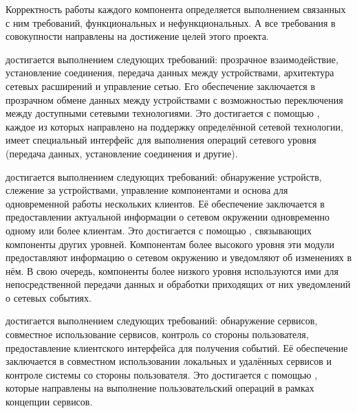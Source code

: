 

%
Корректность работы каждого компонента  определяется выполнением связанных с ним требований, функциональных и нефункциональных.
%
А все требования в совокупности направлены на достижение целей этого проекта. 

%
 достигается выполнением следующих требований: прозрачное взаимодействие, установление соединения, передача данных между устройствами, архитектура сетевых расширений и управление сетью. 
%
Его обеспечение заключается в прозрачном обмене данных между устройствами с возможностью переключения между доступными сетевыми технологиями.
%
Это достигается с помощью , каждое из которых направлено на поддержку определённой сетевой технологии, имеет специальный интерфейс для выполнения операций сетевого уровня (передача данных, установление соединения и другие). 

%
 достигается выполнением следующих требований: обнаружение устройств, слежение за устройствами, управление компонентами и основа для одновременной работы нескольких клиентов.
%
Её обеспечение заключается в предоставлении актуальной информации о сетевом окружении одновременно одному или более клиентам. 
%
Это достигается с помощью , связывающих компоненты других уровней. 
%
Компонентам более высокого уровня эти модули предоставляют информацию о сетевом окружению и уведомляют об изменениях в нём. 
%
В свою очередь, компоненты более низкого уровня используются ими для непосредственной передачи данных и обработки приходящих от них уведомлений о сетевых событиях. 

%
 достигается выполнением следующих требований: обнаружение сервисов, совместное использование сервисов, контроль со стороны пользователя, предоставление клиентского интерфейса для получения событий.
%
Её обеспечение заключается в совместном использовании локальных и удалённых сервисов и контроле системы со стороны пользователя. 
%
Это достигается с помощью , которые направлены на выполнение пользовательский операций в рамках концепции сервисов. 

